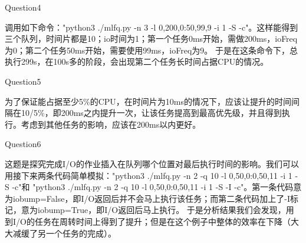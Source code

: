 \documentclass[12pt]{article}
\begin{document}
\begin{large}
	\noindent Question4\\
\end{large}
\hspace*{2em}调用如下命令："python3 ./mlfq.py -n 3 -l 0,200,0:50,99,9 -i 1 -S -c"。这样能得到三个队列，时间片都是10；io时间为1；第一个任务0ms开始，需做200ms，ioFreq为0；第二个任务50ms开始，需要使用99ms，ioFreq为9。
于是在这条命令下，总执行299s，在100s多的阶段，会出现第二个任务长时间占据CPU的情况。\\

\begin{large}
	\noindent Question5\\
\end{large}
\hspace*{2em}为了保证能占据至少5\%的CPU，在时间片为10ms的情况下，应该让提升的时间间隔在10/5\%，即200ms之内提升一次，让该任务提高到最高优先级，并且得到执行。考虑到其他任务的影响，应该在200ms以内更好。\\

\begin{large}
	\noindent Question6\\
\end{large}
\hspace*{2em}这题是探究完成I/O的作业插入在队列哪个位置对最后执行时间的影响。我们可以用接下来两条代码简单模拟："python3 ./mlfq.py -n 2 -q 10 -l 0,50,0:0,50,11 -i 1 -S -c"和 "python3 ./mlfq.py -n 2 -q 10 -l 0,50,0:0,50,11 -i 1 -S -I -c"。第一条代码意为iobump=False，即I/O返回后并不会马上执行该任务；而第二条代码加上了-I标记，意为iobump=True，即I/O返回后马上执行。
于是分析结果我们会发现，用到I/O的任务在周转时间上得到了提升；但是在这个例子中整体的效率在下降（大大减缓了另一个任务的完成）。\\
\end{document}
